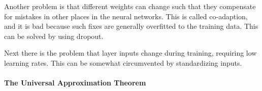 Another problem is that different weights can change such that they compensate for mistakes in other places in the neural networks. This is called co-adaption, and it is bad because such fixes are generally overfitted to the training data. This can be solved by using dropout.

Next there is the problem that layer inputs change during training, requiring low learning rates. This can be somewhat circumvented by standardizing inputs.

\paragraph{The Universal Approximation Theorem}